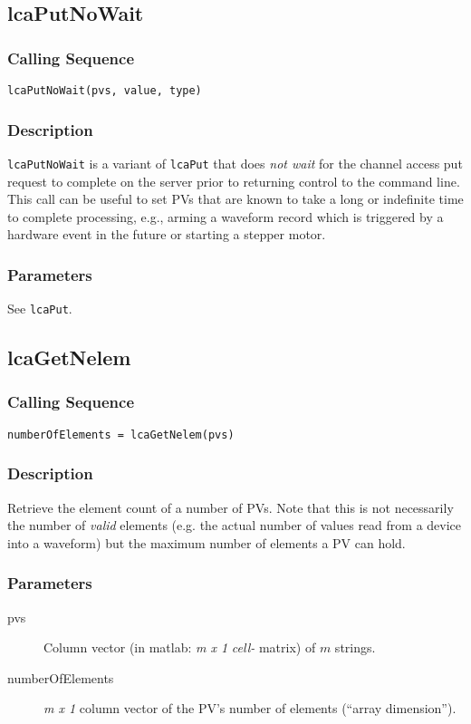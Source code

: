 \documentclass{article}
\newcommand{\com}[1]{{\tt #1}}
\newcommand{\pbrk}{\pagebreak[3]}
\newcommand{\pbrkf}{\pagebreak}
\newcommand{\ita}[1]{\emph{#1}}
\newcommand{\m}{$m$}
\newcommand{\mhack}{$m$} %
\newcommand{\mxl}{$m\times 1$}
\renewcommand{\m}{\ita{m}}
\newcommand{\mhack}{\ita{m}} %
\renewcommand{\mxl}{\ita{m x 1}}
\renewcommand{\pbrk}{}
\renewcommand{\pbrkf}{}
\newcommand{\PVITEM}{
\item[pvs] Column vector (in matlab: \mxl{} \ita{cell-} matrix)
of \mhack{} strings.
}
\begin{document}
\vspace*{\fill}
\pbrkf
\subsection{lcaPutNoWait}
\label{lcaputnowait}
\subsubsection{Calling Sequence}
\begin{verbatim}
lcaPutNoWait(pvs, value, type)
\end{verbatim}
\subsubsection{Description}
\com{lcaPutNoWait} is a variant of \com{lcaPut} that does {\em not wait}
for the channel access put request to complete on the server prior to
returning control to the command line.
This call can be useful to set PVs that are known to take a long
or indefinite time to complete processing, e.g., arming a waveform record
which is triggered by a hardware event in the future or starting a stepper
motor.

\subsubsection{Parameters}
See \com{lcaPut}.

\vspace*{\fill}
\pbrk
\subsection{lcaGetNelem}
\subsubsection{Calling Sequence}
\begin{verbatim}
numberOfElements = lcaGetNelem(pvs)
\end{verbatim}
\subsubsection{Description}
Retrieve the element count of a number of PVs. Note that this is not
necessarily the number of \ita{valid} elements (e.g. the actual number
of values read from a device into a waveform) but the maximum number
of elements a PV can hold.
\subsubsection{Parameters}
\begin{description}
\PVITEM
\item[numberOfElements] \mxl{} column vector of the PV's number
of elements (``array dimension'').
\end{description}
\end{document}
